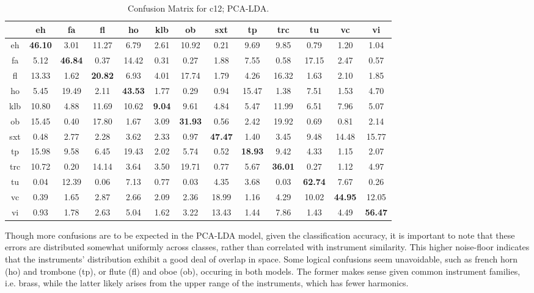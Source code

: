 \begin{landscape}
\begin{table*} %
\begin{center}
\caption{Confusion Matrix for c12; PCA-LDA.}
\begin{tabular}{c | cccccccccccc}
\hline
     &    eh &    fa &   fl &    ho &   klb &    ob &   sxt &    tp &   trc &    tu &    vc &    vi \\
\hline
 eh  & \textbf{46.10} &  3.01 & 11.27 &  6.79 &  2.61 & 10.92 &  0.21 &  9.69 &  9.85 &  0.79 &  1.20 &  1.04 \\
 fa  &  5.12 & \textbf{46.84} &  0.37 & 14.42 &  0.31 &  0.27 &  1.88 &  7.55 &  0.58 & 17.15 &  2.47 &  0.57 \\
 fl & 13.33 &  1.62 & \textbf{20.82} &  6.93 &  4.01 & 17.74 &  1.79 &  4.26 & 16.32 &  1.63 &  2.10 &  1.85 \\
 ho  &  5.45 & 19.49 &  2.11 & \textbf{43.53} &  1.77 &  0.29 &  0.94 & 15.47 &  1.38 &  7.51 &  1.53 &  4.70 \\
 klb & 10.80 &  4.88 & 11.69 & 10.62 &  \textbf{9.04} &  9.61 &  4.84 &  5.47 & 11.99 &  6.51 &  7.96 &  5.07 \\
 ob  & 15.45 &  0.40 & 17.80 &  1.67 &  3.09 & \textbf{31.93} &  0.56 &  2.42 & 19.92 &  0.69 &  0.81 &  2.14 \\
 sxt &  0.48 &  2.77 &  2.28 &  3.62 &  2.33 &  0.97 & \textbf{47.47} &  1.40 &  3.45 &  9.48 & 14.48 & 15.77 \\
 tp  & 15.98 &  9.58 &  6.45 & 19.43 &  2.02 &  5.74 &  0.52 & \textbf{18.93} &  9.42 &  4.33 &  1.15 &  2.07 \\
 trc & 10.72 &  0.20 & 14.14 &  3.64 &  3.50 & 19.71 &  0.77 &  5.67 & \textbf{36.01} &  0.27 &  1.12 &  4.97 \\
 tu  &  0.04 & 12.39 &  0.06 &  7.13 &  0.77 &  0.03 &  4.35 &  3.68 &  0.03 & \textbf{62.74} &  7.67 &  0.26 \\
 vc  &  0.39 &  1.65 &  2.87 &  2.66 &  2.09 &  2.36 & 18.99 &  1.16 &  4.29 & 10.02 & \textbf{44.95} & 12.05 \\
 vi  &  0.93 &  1.78 &  2.63 &  5.04 &  1.62 &  3.22 & 13.43 &  1.44 &  7.86 &  1.43 &  4.49 & \textbf{56.47} \\
\hline
\end{tabular}
\label{tab:confmat_pcalda}
\end{center}
\end{table*}
\end{landscape}

Though more confusions are to be expected in the PCA-LDA model, given the classification accuracy, it is important to note that these errors are distributed somewhat uniformly across classes, rather than correlated with instrument similarity.
This higher noise-floor indicates that the instruments' distribution exhibit a good deal of overlap in space.
Some logical confusions seem unavoidable, such as french horn (ho) and trombone (tp), or flute (fl) and oboe (ob), occuring in both models.
The former makes sense given common instrument families, i.e. brass, while the latter likely arises from the upper range of the instruments, which has fewer harmonics.


